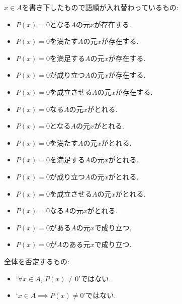 \documentclass[a4paper,12pt,draft]{amsart}
\begin{document}
$x\in A$を書き下したもので語順が入れ替わっているもの:
\begin{itemize}
\item $P(x)=0$となる$A$の元$x$が存在する.
\item $P(x)=0$を満たす$A$の元$x$が存在する.
\item $P(x)=0$を満足する$A$の元$x$が存在する.
\item $P(x)=0$が成り立つ$A$の元$x$が存在する.
\item $P(x)=0$を成立させる$A$の元$x$が存在する.
\item $P(x)=0$なる$A$の元$x$がとれる.
\item $P(x)=0$となる$A$の元$x$がとれる.
\item $P(x)=0$を満たす$A$の元$x$がとれる.
\item $P(x)=0$を満足する$A$の元$x$がとれる.
\item $P(x)=0$が成り立つ$A$の元$x$がとれる.
\item $P(x)=0$を成立させる$A$の元$x$がとれる.
\item $P(x)=0$なる$A$の元$x$がとれる.
\item $P(x)=0$がある$A$の元$x$で成り立つ.
\item $P(x)=0$が$A$のある元$x$で成り立つ.
\end{itemize}
全体を否定するもの:
\begin{itemize}
\item `$\forall x \in A$, $P(x)\neq 0$'ではない.
\item `$x \in A\implies P(x)\neq 0$'ではない.
\end{itemize}
\end{document}
